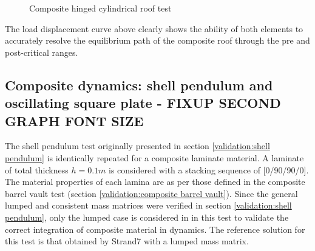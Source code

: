 \begin{figure}[H]
	\caption{\label{ref_label_overall}Composite hinged cylindrical roof test}
\end{figure}

The load displacement curve above clearly shows the ability of both elements to accurately resolve the equilibrium path of the composite roof through the pre and post-critical ranges.

\subsection{Composite dynamics: shell pendulum and oscillating square plate - FIXUP SECOND GRAPH FONT SIZE}

The shell pendulum test originally presented in section \ref{validation:shell pendulum} is identically repeated for a composite laminate material. A laminate of total thickness $h = 0.1m$ is considered with a stacking sequence of [0/90/90/0]. The material properties of each lamina are as per those defined in the composite barrel vault test (section \ref{validation:composite barrel vault}). Since the general lumped and consistent mass matrices were verified in section \ref{validation:shell pendulum}, only the lumped case is considered in in this test to validate the correct integration of composite material in dynamics. The reference solution for this test is that obtained by Strand7 with a lumped mass matrix.

